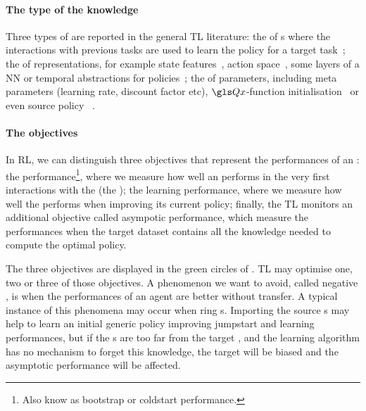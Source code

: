 \paragraph{The type of the knowledge} Three types of  are reported in the general \gls{TL} literature: the  of s where the interactions with previous tasks are used to learn the policy for a target task~\parencite{sunmola2006model,lazaric2008,taylor2008transferring}; the  of representations, for example state features~\parencite{ferguson2006proto,mahadevan2007proto,ferrante2008transfer}, action space~\parencite{sherstov2005improving}, some layers of a \gls{NN} or temporal abstractions for policies~\parencite{sutton1999options}; the  of parameters, including meta parameters (learning rate, discount factor etc), $\Q$-function initialisation~\parencite{torrey2005using} or even source policy  ~\parencite{taylor2007transfer}.

\paragraph{The objectives}

In \gls{RL}, we can distinguish three objectives that represent the performances of an : the  performance\footnote{Also know as bootstrap or coldstart performance.}, where we measure how well an  performs in the very first interactions with the  (the );
the learning performance, where we measure how well the  performs when improving its current policy; finally, the \gls{TL}  monitors an additional objective called asympotic performance, which measure the performances when the target dataset contains all the knowledge needed to compute the optimal policy.

The three objectives are displayed in the green circles of . \gls{TL}  may optimise one, two or three of those objectives. A phenomenon we want to avoid, called negative , is when the performances of an agent are better without transfer. A typical instance of this phenomena may occur when ring s. Importing the source s may help to learn an initial generic policy improving jumpstart and learning performances, but if the s are too far from the target , and the learning algorithm has no mechanism to forget this knowledge, the target  will be biased and the asymptotic performance will be affected.

